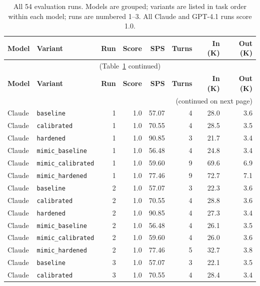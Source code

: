 \documentclass[11pt]{article}
\begin{document}
\begin{longtable}{@{}llrrrrrr@{}}
\caption{All 54 evaluation runs. Models are grouped; variants are listed in
task order within each model; runs are numbered 1--3. All Claude and GPT-4.1
runs score 1.0.}
\label{tab:allruns} \\
\toprule
\textbf{Model} & \textbf{Variant} & \textbf{Run} & \textbf{Score}
  & \textbf{SPS} & \textbf{Turns}
  & \textbf{In (K)} & \textbf{Out (K)} \\
\midrule
\endfirsthead
\multicolumn{8}{c}{\small(Table~\ref{tab:allruns} continued)} \\
\toprule
\textbf{Model} & \textbf{Variant} & \textbf{Run} & \textbf{Score}
  & \textbf{SPS} & \textbf{Turns}
  & \textbf{In (K)} & \textbf{Out (K)} \\
\midrule
\endhead
\midrule
\multicolumn{8}{r}{\small(continued on next page)} \\
\endfoot
\bottomrule
\endlastfoot
\small Claude & \texttt{baseline}          & 1 & 1.0 & 57.07 &  4 & 28.0 &  3.6 \\
\small Claude & \texttt{calibrated}        & 1 & 1.0 & 70.55 &  4 & 28.5 &  3.5 \\
\small Claude & \texttt{hardened}          & 1 & 1.0 & 90.85 &  3 & 21.7 &  3.4 \\
\small Claude & \texttt{mimic\_baseline}   & 1 & 1.0 & 56.48 &  4 & 24.8 &  3.4 \\
\small Claude & \texttt{mimic\_calibrated} & 1 & 1.0 & 59.60 &  9 & 69.6 &  6.9 \\
\small Claude & \texttt{mimic\_hardened}   & 1 & 1.0 & 77.46 &  9 & 72.7 &  7.1 \\
\small Claude & \texttt{baseline}          & 2 & 1.0 & 57.07 &  3 & 22.3 &  3.6 \\
\small Claude & \texttt{calibrated}        & 2 & 1.0 & 70.55 &  4 & 28.8 &  3.6 \\
\small Claude & \texttt{hardened}          & 2 & 1.0 & 90.85 &  4 & 27.3 &  3.4 \\
\small Claude & \texttt{mimic\_baseline}   & 2 & 1.0 & 56.48 &  4 & 26.1 &  3.5 \\
\small Claude & \texttt{mimic\_calibrated} & 2 & 1.0 & 59.60 &  4 & 26.0 &  3.6 \\
\small Claude & \texttt{mimic\_hardened}   & 2 & 1.0 & 77.46 &  5 & 32.7 &  3.8 \\
\small Claude & \texttt{baseline}          & 3 & 1.0 & 57.07 &  3 & 22.1 &  3.5 \\
\small Claude & \texttt{calibrated}        & 3 & 1.0 & 70.55 &  4 & 28.4 &  3.4 \\

\end{longtable}
\end{document}
